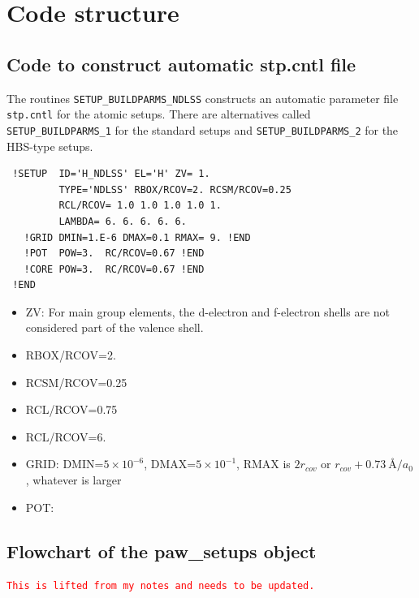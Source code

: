 \documentclass[11pt,a4paper]{report}
\newcommand{\petertt}[1]{\textcolor{red}{\texttt{#1}}}
\begin{document}
\chapter{Code structure}
\section{Code to construct automatic stp.cntl file}
The routines \verb|SETUP_BUILDPARMS_NDLSS| constructs an automatic
parameter file \verb|stp.cntl| for the atomic setups. There are
alternatives called \verb|SETUP_BUILDPARMS_1| for the standard setups
and \verb|SETUP_BUILDPARMS_2| for the HBS-type setups.



\begin{verbatim}
 !SETUP  ID='H_NDLSS' EL='H' ZV= 1.
         TYPE='NDLSS' RBOX/RCOV=2. RCSM/RCOV=0.25
         RCL/RCOV= 1.0 1.0 1.0 1.0 1.
         LAMBDA= 6. 6. 6. 6. 6.
   !GRID DMIN=1.E-6 DMAX=0.1 RMAX= 9. !END
   !POT  POW=3.  RC/RCOV=0.67 !END
   !CORE POW=3.  RC/RCOV=0.67 !END
 !END
\end{verbatim}

\begin{itemize}
\item ZV: For main group elements, the d-electron and f-electron
  shells are not considered part of the valence shell.
\item RBOX/RCOV=2.
\item RCSM/RCOV=0.25
\item RCL/RCOV=0.75
\item RCL/RCOV=6.
\item GRID: DMIN=$5\times 10^{-6}$,
DMAX=$5\times 10^{-1}$,
RMAX is $2r_{cov}$ or $r_{cov}+0.73~$\AA$/a_0$, whatever is larger
\item POT:
\end{itemize}




\section{Flowchart of the paw\_setups object}
\petertt{This is lifted from my notes and needs to be updated.}
\end{document}
